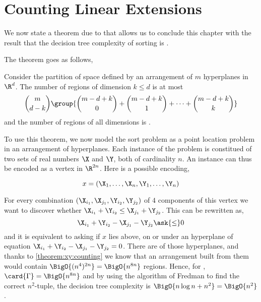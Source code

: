 \section{Counting Linear Extensions}
\label{tree:xy:counting}

We now state a theorem due to \citet*{buck:1943} that allows us to conclude
this chapter with the result that the decision tree complexity of sorting \XY
is .

The theorem goes as follows,

\begin{theorem}\label{theorem:xy:counting}
Consider the partition of space defined by an arrangement of $m$ hyperplanes in
$\R^d$.
The number of regions of dimension $k \le d$ is at most
\begin{displaymath}
\binom{m}{d-k} \group{ \binom{m-d+k}{0} + \binom{m-d+k}{1} + \cdots + \binom{m-d+k}{k} }
\end{displaymath}
and the number of regions of all dimensions is .
\end{theorem}

To use this theorem, we now model the sort \XY problem as a point location problem in an
arrangement of hyperplanes. Each instance of the problem is constitued of two
sets of real numbers $\X$ and $\Y$, both of cardinality $n$. An instance can
thus be encoded as a vertex in $\R^{2n}$. Here is a possible encoding,

$$x = (\X_1, \ldots, \X_n, \Y_1, \ldots, \Y_n)$$

For every combination $(\X_{i_1}, \X_{j_1}, \Y_{i_2}, \Y_{j_2})$ of $4$
components of this vertex we want to discover whether $\X_{i_1} + \Y_{i_2} \le
\X_{j_1} + \Y_{j_2}$. This can be rewritten as,
$$\X_{i_1} + \Y_{i_2} - \X_{j_1} - \Y_{j_2} \ask{\le} 0$$
and it is equivalent to asking if $x$ lies above, on or under an
hyperplane of equation $\X_{i_1} + \Y_{i_2} - \X_{j_1} - \Y_{j_2} = 0$. There
are  of those hyperplanes, and thanks to \ref{theorem:xy:counting}
we know that an arrangement built from them would contain
$\BigO{(n^4)^{2n}} = \BigO{n^{8n}}$ regions. Hence, for \XY, $\card{\Gamma} =
\BigO{n^{8n}}$ and by using the algorithm of Fredman to find the correct
$n^2$-tuple, the decision tree complexity is
$\BigO{n \log n + n^2} = \BigO{n^2}$.

